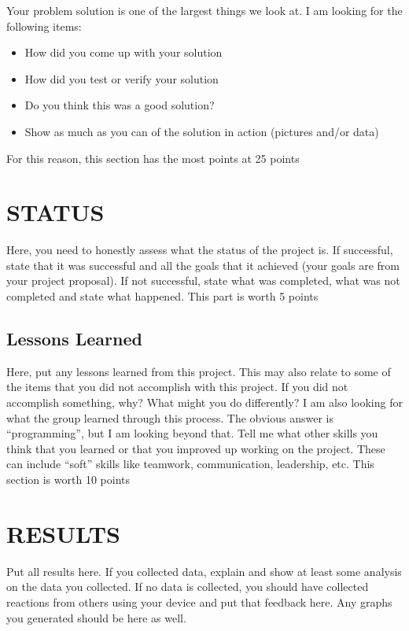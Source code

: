 \documentclass[12pt]{article}
\begin{document}
Your problem solution is one of the largest things we look at. I am looking for the following items:

\begin{itemize}
    \item How did you come up with your solution
    \item How did you test or verify your solution
    \item Do you think this was a good solution?
    \item Show as much as you can of the solution in action (pictures and/or data)
\end{itemize}

For this reason, this section has the most points at 25 points

\section{STATUS}
Here, you need to honestly assess what the status of the project is.  If successful, state that it was successful and all the goals that it achieved (your goals are from your project proposal).  If not successful, state what was completed, what was not completed and state what happened. This part is worth 5 points

\subsection{Lessons Learned}
Here, put any lessons learned from this project.  This may also relate to some of the items that you did not accomplish with this project. If you did not accomplish something, why? What might you do differently? I am also looking for what the group learned through this process. The obvious answer is ``programming'', but I am looking beyond that. Tell me what other skills you think that you learned or that you improved up working on the project. These can include ``soft'' skills like teamwork, communication, leadership, etc. This section is worth 10 points

\section{RESULTS}
 
Put all results here.  If you collected data, explain and show at least some analysis on the data you collected.  If no data is collected, you should have collected reactions from others using your device and put that feedback here.  Any graphs you generated should be here as well.
\end{document}
